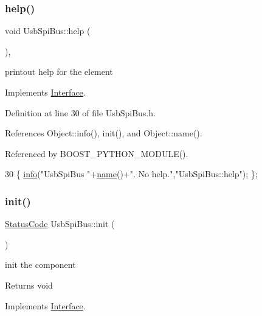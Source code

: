 \subsubsection{\texorpdfstring{help()}{help()}}
{\footnotesize\ttfamily void Usb\+Spi\+Bus\+::help (\begin{DoxyParamCaption}{ }\end{DoxyParamCaption})\hspace{0.3cm}{\ttfamily [inline]}, {\ttfamily [virtual]}}

printout help for the element 

Implements \hyperlink{classInterface_aedd3cf1d964c837e7848ccf81dc9c760}{Interface}.



Definition at line 30 of file Usb\+Spi\+Bus.\+h.



References Object\+::info(), init(), and Object\+::name().



Referenced by B\+O\+O\+S\+T\+\_\+\+P\+Y\+T\+H\+O\+N\+\_\+\+M\+O\+D\+U\+L\+E().


\begin{DoxyCode}
30 \{ \hyperlink{classObject_a644fd329ea4cb85f54fa6846484b84a8}{info}(\textcolor{stringliteral}{"UsbSpiBus "}+\hyperlink{classObject_a300f4c05dd468c7bb8b3c968868443c1}{name}()+\textcolor{stringliteral}{". No help."},\textcolor{stringliteral}{"UsbSpiBus::help"}); \};
\end{DoxyCode}
\mbox{\label{classUsbSpiBus_a38203aaf0806b9a1c7cc0686831a7ce9}} 
\subsubsection{\texorpdfstring{init()}{init()}}
{\footnotesize\ttfamily \hyperlink{classStatusCode}{Status\+Code} Usb\+Spi\+Bus\+::init (\begin{DoxyParamCaption}{ }\end{DoxyParamCaption})\hspace{0.3cm}{\ttfamily [virtual]}}

init the component

\begin{DoxyReturn}{Returns}
void 
\end{DoxyReturn}


Implements \hyperlink{classInterface_a1d095c113b1e89d1f5f68323856fee63}{Interface}.



